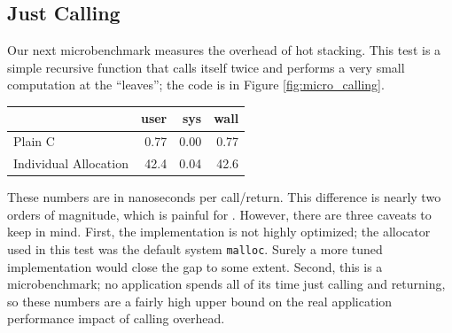 \documentclass[acmsmall,anonymous,review]{acmart}\settopmatter{printfolios=true,printccs=false,printacmref=false}
\begin{document}
\subsection{Just Calling}

Our next microbenchmark measures the overhead of hot stacking.
This test is a simple recursive function that calls itself twice and performs a very small computation at the ``leaves''; the code is in Figure \ref{fig:micro_calling}.

\vspace{1em}
\begin{tabular}{|l|r|r|r|}
  \hline
   & user & sys & wall \\
  \hline
  \hline
  Plain C & 0.77 & 0.00 & 0.77 \\
  \hline
  Individual Allocation & 42.4 & 0.04 & 42.6 \\
  \hline
\end{tabular}
\vspace{1em}

These numbers are in nanoseconds per call/return.
This difference is nearly two orders of magnitude, which is painful for \charcoal{}.
However, there are three caveats to keep in mind.
First, the \charcoal{} implementation is not highly optimized; the allocator used in this test was the default system \texttt{malloc}.
Surely a more tuned implementation would close the gap to some extent.
Second, this is a microbenchmark; no application spends all of its time just calling and returning, so these numbers are a fairly high upper bound on the real application performance impact of calling overhead.
\end{document}
